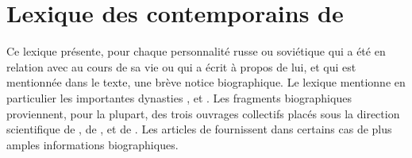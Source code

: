 \chapter[%
Lexique des contemporains de Vladimir Sofronickij][%
Lexique des contemporains de Vladimir Sofronickij]{%
Lexique des contemporains de \VSofronitsky{}}
\label{chap:Lexique}

Ce lexique présente, pour chaque personnalité russe ou soviétique qui a été
en relation avec \VSofronitsky{} au cours de sa vie ou qui a écrit à propos
de lui, et qui est mentionnée dans le texte, une brève notice biographique.
Le lexique mentionne en particulier les importantes dynasties \Scriabine{},
\Sofronitsky{} et \Vizel{}.
Les fragments biographiques proviennent, pour la plupart, des trois ouvrages
collectifs placés sous la direction scientifique de \citet{Milshteyn82a}, de
\citet{Nikonovich08}, et de \citet{Scriabine}.
Les articles de \citet{Voskobojnikov09a, Voskobojnikov09b} fournissent dans
certains cas de plus amples informations biographiques.

\vspace{\baselineskip}

